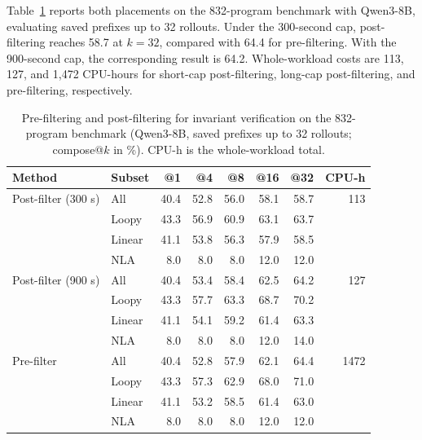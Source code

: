 Table~\ref{tab:prefilt-vs-postfilt} reports both placements on the 832-program
benchmark with Qwen3-8B, evaluating saved prefixes up to 32 rollouts.  Under
the 300-second cap, post-filtering reaches 58.7 at \(k{=}32\),
compared with 64.4 for pre-filtering.  With the 900-second cap, the
corresponding result is 64.2.  Whole-workload costs are 113, 127, and 1,472
CPU-hours for short-cap post-filtering, long-cap post-filtering, and
pre-filtering, respectively.

\begin{table}[t]
\centering
\small
\caption{Pre-filtering and post-filtering for invariant verification on the
  832-program benchmark (Qwen3-8B, saved prefixes up to 32 rollouts; compose@\(k\)
  in \%).  CPU-h is the whole-workload total.}
\label{tab:prefilt-vs-postfilt}
\begin{tabular}{ll rrrrr r}
\toprule
\rowcolor{algobg}
Method & Subset & @1 & @4 & @8 & @16 & @32 & CPU-h \\
\midrule
Post-filter (300 s)  & All    & 40.4 & 52.8 & 56.0 & 58.1 & 58.7 &  113 \\
                    & Loopy  & 43.3 & 56.9 & 60.9 & 63.1 & 63.7 &      \\
                    & Linear & 41.1 & 53.8 & 56.3 & 57.9 & 58.5 &      \\
                    & NLA    &  8.0 &  8.0 &  8.0 & 12.0 & 12.0 &      \\
\midrule
Post-filter (900 s)  & All    & 40.4 & 53.4 & 58.4 & 62.5 & 64.2 &  127 \\
                    & Loopy  & 43.3 & 57.7 & 63.3 & 68.7 & 70.2 &      \\
                    & Linear & 41.1 & 54.1 & 59.2 & 61.4 & 63.3 &      \\
                    & NLA    &  8.0 &  8.0 &  8.0 & 12.0 & 14.0 &      \\
\midrule
Pre-filter          & All    & 40.4 & 52.8 & 57.9 & 62.1 & 64.4 & 1472 \\
                    & Loopy  & 43.3 & 57.3 & 62.9 & 68.0 & 71.0 &      \\
                    & Linear & 41.1 & 53.2 & 58.5 & 61.4 & 63.0 &      \\
                    & NLA    &  8.0 &  8.0 &  8.0 & 12.0 & 12.0 &      \\
\bottomrule
\end{tabular}
\end{table}
